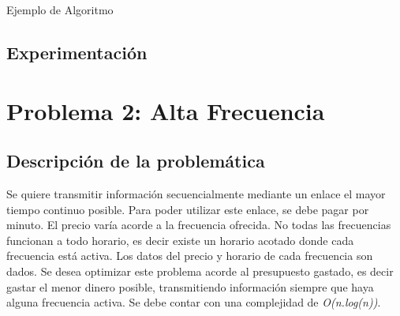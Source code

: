 \documentclass[a4paper]{article}
\begin{document}
\begin{algorithm}[h!]
\NoCaptionOfAlgo
\caption{Ejemplo de Algoritmo}
\end{algorithm}


\subsection{Experimentaci\'on}

\newpage

\section{Problema 2: Alta Frecuencia}
\subsection{Descripci\'on de la problem\'atica}

Se quiere transmitir informaci\'on secuencialmente mediante un enlace el mayor tiempo continuo posible. Para poder utilizar este enlace, se debe pagar por minuto. El precio var\'ia acorde a la frecuencia ofrecida. No todas las frecuencias funcionan a todo horario, es decir existe un horario acotado donde cada frecuencia est\'a activa. Los datos del precio y horario de cada frecuencia son dados. Se desea optimizar este problema acorde al presupuesto gastado, es decir gastar el menor dinero posible, transmitiendo informaci\'on siempre que haya alguna frecuencia activa. Se debe contar con una complejidad de \textit{O(n.log(n))}.
\end{document}
